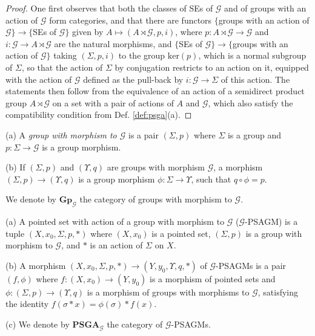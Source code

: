 \documentclass[10pt]{amsart}
\numberwithin{equation}{subsection}
\begin{document}
\begin{proof}
One first observes that both the classes of SEs of $\mathcal G$ and of groups with an action of $\mathcal G$ form categories, and that 
there are functors $\{$groups with an action of $\mathcal G\}\to\{$SEs of $\mathcal G\}$ given by $A\mapsto (A\rtimes\mathcal G,p,i)$, where 
$p : A\rtimes\mathcal G\to\mathcal G$ and $i : \mathcal G\to A\rtimes\mathcal G$ are the natural morphisms, and 
$\{$SEs of $\mathcal G\}\to\{$groups with an action of $\mathcal G\}$ taking $(\Sigma,p,i)$ to the group $\mathrm{ker}(p)$, which is 
a normal subgroup of $\Sigma$, so that the action of $\Sigma$ by conjugation restricts to an action on it, equipped with the action of $\mathcal G$ defined as the 
pull-back by $i : \mathcal G\to\Sigma$ of this action. The statements then follow from the equivalence of an   
action of a semidirect product group $A\rtimes\mathcal G$ on a set with a pair of actions of $A$ and $\mathcal G$, which also satisfy the compatibility condition 
from Def. \ref{def:psga}(a). 
\end{proof}
   


\begin{defn}
(a) A {\it group with morphism to $\mathcal G$} is a pair $(\Sigma,p)$ where $\Sigma$ is a group and 
$p : \Sigma\to\mathcal G$ is a group morphism. 

(b) If $(\Sigma,p)$ and $(\Upsilon,q)$ are groups with morphism $\mathcal G$, a morphism 
$(\Sigma,p)\to(\Upsilon,q)$ is a group morphism $\phi : \Sigma\to\Upsilon$, such that 
$q\circ\phi=p$. 
\end{defn}
We denote by $\mathbf{Gp}_{\mathcal G}$ the category of groups with morphism to $\mathcal G$. 

\begin{defn}%
    (a) A pointed set with action of a group with morphism to $\mathcal G$ ($\mathcal G$-PSAGM) is a tuple
$(X,x_0,\Sigma,p,*)$ where $(X,x_0)$ is a pointed set, $(\Sigma,p)$ is a group with morphism to 
$\mathcal G$, and $*$ is an action of 
$\Sigma$ on $X$. 

(b) A morphism $(X,x_0,\Sigma,p,*)\to(Y,y_0,\Upsilon,q,*)$ of $\mathcal G$-PSAGMs is a pair $(f,\phi)$ where $f : (X,x_0)\to (Y,y_0)$
is a morphism of pointed sets and $\phi : (\Sigma,p)\to(\Upsilon,q)$ is a morphism of groups with morphisms to
$\mathcal G$, satisfying the identity $f(\sigma*x)=\phi(\sigma)*f(x)$. 

(c) We denote by $\mathbf{PSGA}_{\mathcal G}$  the category of $\mathcal G$-PSAGMs. 
\end{defn}
\end{document}
